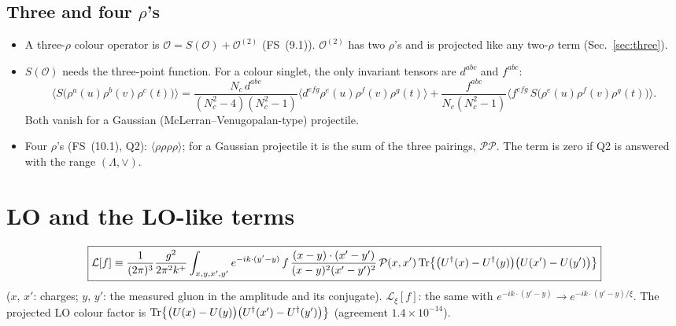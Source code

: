 \documentclass[10pt]{article}
\numberwithin{equation}{section}
\newcommand{\OO}{\mathcal O}
\newcommand{\PP}{\mathcal P}
\newcommand{\LL}{\mathcal L}
\newcommand{\pre}{\frac{1}{(2\pi)^3}}
\begin{document}

\subsection{Three and four \texorpdfstring{$\rho$}{rho}'s}
\begin{itemize}
\item A three-$\rho$ colour operator is $\OO=S(\OO)+\OO^{(2)}$ (FS~(9.1)). $\OO^{(2)}$ has two $\rho$'s and is projected like any two-$\rho$ term (Sec.~\ref{sec:three}).
\item $S(\OO)$ needs the three-point function. For a colour singlet, the only invariant tensors are $d^{abc}$ and $f^{abc}$:
\begin{equation}
\langle S\big(\rho^a(u)\rho^b(v)\rho^c(t)\big)\rangle=\frac{N_c\,d^{abc}}{(N_c^2-4)(N_c^2-1)}\langle d^{efg}\rho^e(u)\rho^f(v)\rho^g(t)\rangle+\frac{f^{abc}}{N_c(N_c^2-1)}\langle f^{efg}\,S\big(\rho^e(u)\rho^f(v)\rho^g(t)\big)\rangle.
\end{equation}
Both vanish for a Gaussian (McLerran--Venugopalan-type) projectile.
\item Four $\rho$'s (FS~(10.1), Q2): $\langle\rho\rho\rho\rho\rangle$; for a Gaussian projectile it is the sum of the three pairings, $\PP\PP$. The term is zero if Q2 is answered with the range $(\Lambda,\vee)$.
\end{itemize}

\section{LO and the LO-like terms}\label{sec:LO}
\begin{equation}
\boxed{\LL[f]\equiv\pre\frac{g^2}{2\pi^2k^+}\int_{x,y,x',y'}e^{-ik\cdot(y'-y)}\,f\,\frac{(x-y)\cdot(x'-y')}{(x-y)^2(x'-y')^2}\,\PP(x,x')\,{\rm Tr}\big\{\big(U^\dagger(x)-U^\dagger(y)\big)\big(U(x')-U(y')\big)\big\}}
\label{eq:LO}
\end{equation}
($x$, $x'$: charges; $y$, $y'$: the measured gluon in the amplitude and its conjugate). $\LL_\xi[f]$: the same with $e^{-ik\cdot(y'-y)}\to e^{-ik\cdot(y'-y)/\xi}$. The projected LO colour factor is ${\rm Tr}\big\{\big(U(x)-U(y)\big)\big(U^\dagger(x')-U^\dagger(y')\big)\big\}$ (agreement $1.4\times10^{-14}$).
\end{document}
